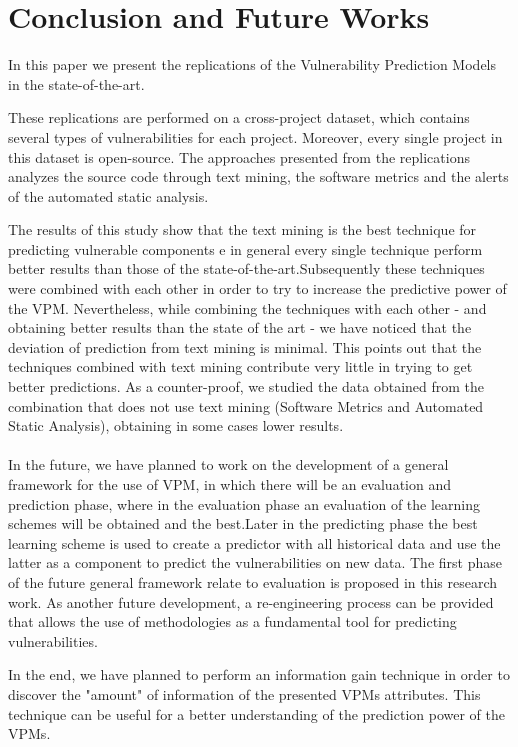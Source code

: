 \documentclass[twocolumn,10pt]{asme2ej}
\begin{document}
\section{Conclusion and Future Works}
In this paper we present the replications of the Vulnerability Prediction Models in the state-of-the-art.


These replications are performed on a cross-project dataset, which contains several types of vulnerabilities for each project. Moreover, every single project in this dataset is open-source.
The approaches presented from the replications analyzes the source code through text mining, the software metrics and the alerts of the automated static analysis.

The results of this study show that the text mining is the best technique for predicting vulnerable components e in general every single technique perform better results than those of the state-of-the-art.Subsequently these techniques were combined with each other in order to try to increase the predictive power of the VPM. Nevertheless, while combining the techniques with each other - and obtaining better results than the state of the art - we have noticed that the deviation of prediction from text mining is minimal. 
This points out that the techniques combined with text mining contribute very little in trying to get better predictions. As a counter-proof, we studied the data obtained from the combination that does not use text mining (Software Metrics and Automated Static Analysis), obtaining in some cases lower results. 
\\\\
In the future, we have planned to work on the development of a general framework for the use of VPM, in which there will be an evaluation and prediction phase, where in the evaluation phase an evaluation of the learning schemes will be obtained and the best.Later in the predicting phase the best learning scheme is used to create a predictor with all historical data and use the latter as a component to predict the vulnerabilities on new data. 
The first phase of the future general framework relate to evaluation is proposed in this research work.
As another future development, a re-engineering process can be provided that allows the use of methodologies as a fundamental tool for predicting vulnerabilities.

In the end, we have planned to perform an information gain technique in order to discover the "amount" of information of the presented VPMs attributes. This technique can be useful for a better understanding of the prediction power of the VPMs.
\end{document}
